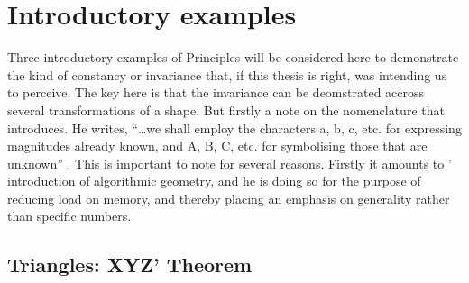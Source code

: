 \documentclass[a4paper, 12pt]{article}
\begin{document}


\section{Introductory examples}
\label{sec:examples}

Three introductory examples of Principles will be considered here to demonstrate the kind of constancy or invariance that, if this thesis is right, \citeauthor{descartes_principles_1982} was intending us to perceive. The key here is that the invariance can be deomstrated accross several transformations of a shape. But firstly a note on the nomenclature that \citeauthor{descartes_philosophical_1911} introduces. He writes,  ``\dots we shall employ the characters a, b, c, etc. for expressing magnitudes already known, and A, B, C, etc. for symbolising those that are unknown'' \citep[Rule~XVI, p.~67]{descartes_philosophical_1911}. This is important to note for several reasons. Firstly it amounts to \citeauthor{descartes_philosophical_1911}' introduction of algorithmic geometry, and he is doing so for the purpose of reducing load on memory, and thereby placing an emphasis on generality rather than specific numbers.  

\subsection{Triangles: XYZ' Theorem}
\label{subsec:triangles}

\end{document}
